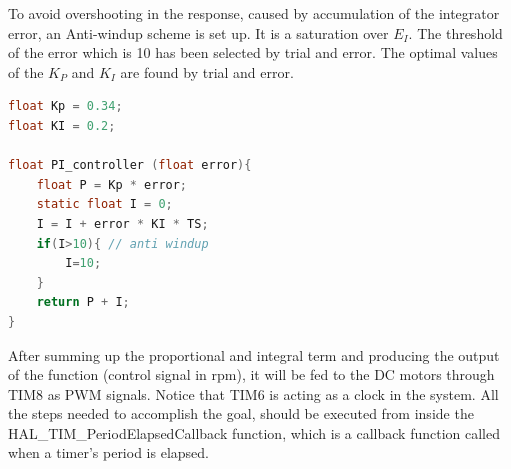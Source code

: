 \documentclass[english]{article}
\begin{document}
To avoid overshooting in the response, caused by accumulation of the 
integrator error, an Anti-windup scheme is set up. It is a saturation over
$E_I$. The threshold of the error which is 10 has been selected by trial and error.
The optimal values of the $K_P$  and $K_I$ are found by trial and error. 
\begin{lstlisting}[language=C, caption={PI Controller}, label={lst:PI} ]
float Kp = 0.34;
float KI = 0.2;

float PI_controller (float error){
    float P = Kp * error;
    static float I = 0;
    I = I + error * KI * TS;
    if(I>10){ // anti windup
        I=10;
    }
    return P + I;
}    
\end{lstlisting}
After summing up the proportional and integral term and producing the output
 of the function (control signal in rpm), it will be fed to the DC motors
  through TIM8 as PWM signals. Notice that TIM6 is acting as a clock in the
   system. All the steps needed to accomplish the goal, should be executed 
   from inside the HAL\_TIM\_PeriodElapsedCallback function, which is a callback
    function called when a timer’s period is elapsed. 
\end{document}
